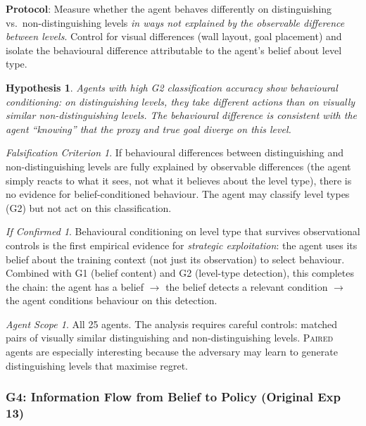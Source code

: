 \documentclass[11pt,a4paper]{article}
\newtheorem{hypothesis}{Hypothesis}[subsection]
\theoremstyle{remark}
\newtheorem*{falsification}{Falsification Criterion}
\newtheorem*{implication}{If Confirmed}
\newtheorem*{agentscope}{Agent Scope}
\newcommand{\paired}{\textsc{Paired}}
\begin{document}
\textbf{Protocol}: Measure whether the agent behaves differently on distinguishing vs.\ non-distinguishing levels \textit{in ways not explained by the observable difference between levels}. Control for visual differences (wall layout, goal placement) and isolate the behavioural difference attributable to the agent's belief about level type.

\begin{hypothesis}
Agents with high G2 classification accuracy show behavioural conditioning: on distinguishing levels, they take different actions than on visually similar non-distinguishing levels. The behavioural difference is consistent with the agent ``knowing'' that the proxy and true goal diverge on this level.
\end{hypothesis}

\begin{falsification}
If behavioural differences between distinguishing and non-distinguishing levels are fully explained by observable differences (the agent simply reacts to what it sees, not what it believes about the level type), there is no evidence for belief-conditioned behaviour. The agent may classify level types (G2) but not act on this classification.
\end{falsification}

\begin{implication}
Behavioural conditioning on level type that survives observational controls is the first empirical evidence for \textit{strategic exploitation}: the agent uses its belief about the training context (not just its observation) to select behaviour. Combined with G1 (belief content) and G2 (level-type detection), this completes the chain: the agent has a belief $\to$ the belief detects a relevant condition $\to$ the agent conditions behaviour on this detection.
\end{implication}

\begin{agentscope}
All 25 agents. The analysis requires careful controls: matched pairs of visually similar distinguishing and non-distinguishing levels. \paired{} agents are especially interesting because the adversary may learn to generate distinguishing levels that maximise regret.
\end{agentscope}

\subsubsection{G4: Information Flow from Belief to Policy (Original Exp 13)}
\label{exp:gmg4}
\end{document}
